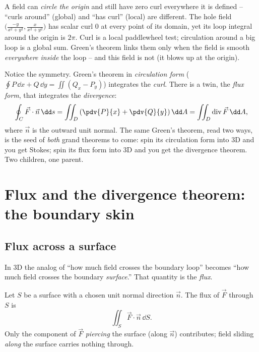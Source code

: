 \begin{trapbox}
A field can \emph{circle the origin} and still have zero curl everywhere it is
defined -- ``curls around'' (global) and ``has curl'' (local) are different. The
hole field $\big(\frac{-y}{x^2+y^2},\frac{x}{x^2+y^2}\big)$ has scalar curl $0$ at
every point of its domain, yet its loop integral around the origin is $2\pi$.
Curl is a local paddlewheel test; circulation around a big loop is a global sum.
Green's theorem links them only when the field is smooth \emph{everywhere inside}
the loop -- and this field is not (it blows up at the origin).
\end{trapbox}

\begin{aestheticbox}
Notice the symmetry. Green's theorem in \emph{circulation form}
($\oint P\,\dd x+Q\,\dd y = \iint (Q_x-P_y)$) integrates the \emph{curl}. There is
a twin, the \emph{flux form}, that integrates the \emph{divergence}:
\[
  \oint_C \vec F\cdot \vec n\,\dd s = \iint_D \left(\pdv{P}{x}+\pdv{Q}{y}\right)\dd A
  = \iint_D \operatorname{div}\vec F\,\dd A,
\]
where $\vec n$ is the outward unit normal. The same Green's theorem, read two ways,
is the seed of \emph{both} grand theorems to come: spin its circulation form into
3D and you get Stokes; spin its flux form into 3D and you get the divergence
theorem. Two children, one parent.
\end{aestheticbox}

\section{Flux and the divergence theorem: the boundary skin}
\label{ch35:divthm}

\subsection{Flux across a surface}

In 3D the analog of ``how much field crosses the boundary loop'' becomes ``how much
field crosses the boundary \emph{surface}.'' That quantity is the \emph{flux}.

\begin{definition}
\label{ch35:def-flux}
Let $S$ be a surface with a chosen unit normal direction $\vec n$. The flux of
$\vec F$ through $S$ is
\[
  \iint_S \vec F\cdot\vec n\,\dd S.
\]
Only the component of $\vec F$ \emph{piercing} the surface (along $\vec n$)
contributes; field sliding \emph{along} the surface carries nothing through.
\end{definition}

